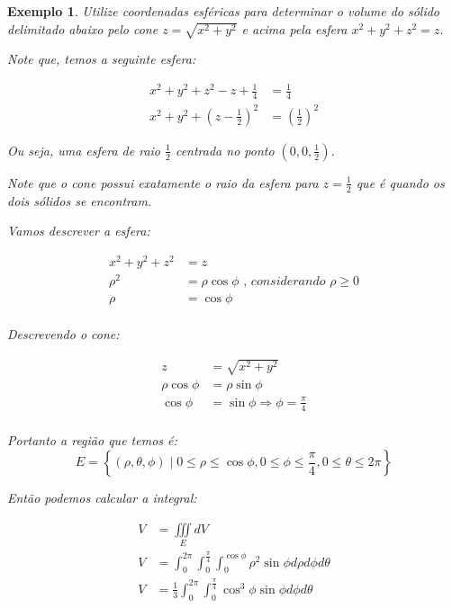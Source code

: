 \documentclass{article}
\newcommand{\tripleint}[2] {\iiint\limits_{#1} #2}
\newtheorem{example}{Exemplo}[section]
\begin{document}
        \begin{example}
            Utilize coordenadas esféricas para determinar o volume do sólido delimitado abaixo pelo cone
            $z = \sqrt{x^2 + y^2}$ e acima pela esfera $x^2 + y^2 + z^2 = z$.

            Note que, temos a seguinte esfera:

            \begin{align*}
                x^2 + y^2 + z^2 - z + \frac{1}{4} &= \frac{1}{4}\\
                x^2 + y^2 + \left( z - \frac{1}{2} \right)^2 &= \left(\frac{1}{2}\right)^2
            \end{align*}

            Ou seja, uma esfera de raio $\frac{1}{2}$ centrada no ponto $\left( 0, 0, \frac{1}{2} \right)$.

            Note que o cone possui exatamente o raio da esfera para $z = \frac{1}{2}$ que é quando os dois 
            sólidos se encontram.

            Vamos descrever a esfera:

            \begin{align*}
                x^2 + y^2 + z^2 &= z\\
                \rho^2 &= \rho \cos \phi \textit{ , considerando }\rho \geq 0\\
                \rho &= \cos \phi\\
            \end{align*}

            Descrevendo o cone:

            \begin{align*}
                z &= \sqrt{x^2 + y^2}\\
                \rho \cos \phi &= \rho \sin \phi\\
                \cos \phi &= \sin \phi \Rightarrow \phi = \frac{\pi}{4}\\
            \end{align*}

            Portanto a região que temos é:
            \[
                E = \left\{ (\rho, \theta, \phi) \mid 0 \leq \rho \leq \cos \phi, 0 \leq \phi \leq \frac{\pi}{4}, 0 \leq \theta \leq 2\pi \right\}
            \]

            Então podemos calcular a integral:

            \begin{align*}
                V &= \tripleint{E}{dV}\\
                V &= \int_0^{2\pi} \int_0^{\frac{\pi}{4}} \int_0^{\cos \phi} \rho^2 \sin \phi d\rho d\phi d\theta\\
                V &= \frac{1}{3} \int_0^{2\pi} \int_0^{\frac{\pi}{4}} \cos^3 \phi \sin \phi d\phi d\theta\\
            \end{align*}


\end{example}
\end{document}
